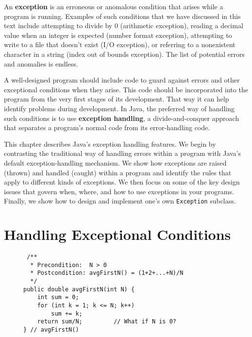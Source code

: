 An {\bf exception} is an erroneous or anomalous
condition that arises  while a program is
running. Examples of such conditions that we have discussed in this
text include attempting to divide by 0 (arithmetic exception), reading
a decimal value when an integer is expected (number format exception),
attempting to write to a file that doesn't exist (I/O exception), or
referring to a nonexistent character in a string (index out of bounds
exception).  The list of potential errors and anomalies is endless.

A well-designed program should include code to guard against errors
and other exceptional conditions when they arise.  This code should be
incorporated into the program from the very first stages of its
development.  That way it can help identify problems during
development. In Java, the preferred way of handling such conditions is
to use {\bf exception handling}, a 
divide-and-conquer approach that separates a program's normal code 
from its error-handling code.


This chapter describes Java's exception handling features.  We begin
by contrasting the traditional way of handling errors within a program
with Java's default exception-handling mechanism.  We show how
exceptions are raised (thrown) and handled (caught) within a program
and identify the rules that apply to different kinds of exceptions.
We then focus on some of the key design issues that govern when,
where, and how to use exceptions in your programs.  Finally, we show
how to design and implement one's own {\tt Exception} subclass.

\section{Handling Exceptional Conditions}

\begin{figure}[b]
\jjjprogstart
\begin{jjjlisting}
\begin{lstlisting}
 /**
  * Precondition:  N > 0
  * Postcondition: avgFirstN() = (1+2+...+N)/N
  */
public double avgFirstN(int N) {
    int sum = 0;
    for (int k = 1; k <= N; k++)
        sum += k;
    return sum/N;         // What if N is 0?
} // avgFirstN()
\end{lstlisting}
\end{jjjlisting}
\end{figure}

